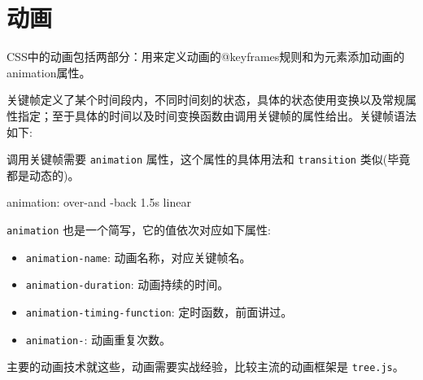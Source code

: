 \section{动画}

CSS中的动画包括两部分：用来定义动画的@keyframes规则和为元素添加动画的animation属性。

关键帧定义了某个时间段内，不同时间刻的状态，具体的状态使用变换以及常规属性指定；至于具体的时间以及时间变换函数由调用关键帧的属性给出。关键帧语法如下:


调用关键帧需要 \texttt{animation} 属性，这个属性的具体用法和 \texttt{transition} 类似(毕竟都是动态的)。

\begin{HTML}
animation: over-and  -back 1.5s linear 
\end{HTML}

\texttt{animation} 也是一个简写，它的值依次对应如下属性:
\begin{itemize}
    \item \texttt{animation-name}: 动画名称，对应关键帧名。
    \item \texttt{animation-duration}: 动画持续的时间。
    \item \texttt{animation-timing-function}: 定时函数，前面讲过。
    \item \texttt{animation-}: 动画重复次数。
\end{itemize}

主要的动画技术就这些，动画需要实战经验，比较主流的动画框架是 \texttt{tree.js}。

\newpage